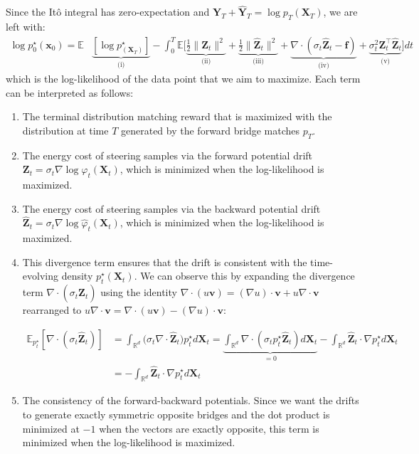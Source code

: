 \documentclass{article}
\begin{document}
Since the Itô integral has zero-expectation and $\boldsymbol{Y}_T+\widehat{\boldsymbol{Y}}_T=\log p_T(\boldsymbol{X}_T)$, we are left with:
\begin{align}
    \log p^\star_0(\boldsymbol{x}_0)=\mathbb{E}&\underbrace{\left[\log p^\star_(\boldsymbol{X}_T)\right]}_{\text{(i)}}-\int_0^T\mathbb{E}\bigg[\underbrace{\frac{1}{2}\|\boldsymbol{Z}_t\|^2}_{\text{(ii)}}+\underbrace{\frac{1}{2}\|\widehat{\boldsymbol{Z}}_t\|^2}_{\text{(iii)}}+\underbrace{\nabla\cdot (\sigma_t\widehat{\boldsymbol{Z}}_t-\boldsymbol{f})}_{\text{(iv)}}+ \underbrace{\sigma_t^2\boldsymbol{Z}_t^\top \widehat{\boldsymbol{Z}}_t}_{\text{(v)}}\bigg]dt\label{eq:fbsde-lower-bound-true}
\end{align}
which is the log-likelihood of the data point that we aim to maximize. Each term can be interpreted as follows:
\begin{enumerate}
    \item The terminal distribution matching reward that is maximized with the distribution at time $T$ generated by the forward bridge matches $p_T$.
    \item The energy cost of steering samples via the forward potential drift $\boldsymbol{Z}_t=\sigma_t\nabla\log \varphi_t(\boldsymbol{X}_t)$, which is minimized when the log-likelihood is maximized.
    \item The energy cost of steering samples via the backward potential drift $\widehat{\boldsymbol{Z}}_t=\sigma_t\nabla \log \hat{\varphi}_t(\boldsymbol{X}_t)$, which is minimized when the log-likelihood is maximized.
    \item This divergence term ensures that the drift is consistent with the time-evolving density $p^\star_t(\boldsymbol{X}_t)$. We can observe this by expanding the divergence term $\nabla\cdot (\sigma_t\widehat{\boldsymbol{Z}}_t)$ using the identity $\nabla\cdot (u\boldsymbol{v})=(\nabla u)\cdot \boldsymbol{v}+u \nabla\cdot \boldsymbol{v}$ rearranged to $u \nabla\cdot \boldsymbol{v}=\nabla\cdot (u\boldsymbol{v})-(\nabla u)\cdot \boldsymbol{v}$:
    \begin{small}
    \begin{align}
        \mathbb{E}_{p^\star_t}\left[\nabla\cdot (\sigma_t\widehat{\boldsymbol{Z}}_t)\right]&=\int_{\mathbb{R}^d}\big(\sigma_t\nabla\cdot \widehat{\boldsymbol{Z}}_t\big)p^\star_t d\boldsymbol{X}_t=\underbrace{\int_{\mathbb{R}^d}\nabla \cdot (\sigma_t p^\star_t\widehat{\boldsymbol{Z}}_t)d\boldsymbol{X}_t}_{=0}-\int_{\mathbb{R}^d}\widehat{\boldsymbol{Z}}_t\cdot \nabla p^\star_td\boldsymbol{X}_t\nonumber\\
        &=-\int_{\mathbb{R}^d}\widehat{\boldsymbol{Z}}_t\cdot \nabla p^\star_td\boldsymbol{X}_t
    \end{align}
    \end{small}
    \item The consistency of the forward-backward potentials. Since we want the drifts to generate exactly symmetric opposite bridges and the dot product is minimized at $-1$ when the vectors are exactly opposite, this term is minimized when the log-likelihood is maximized.
\end{enumerate}
\end{document}
